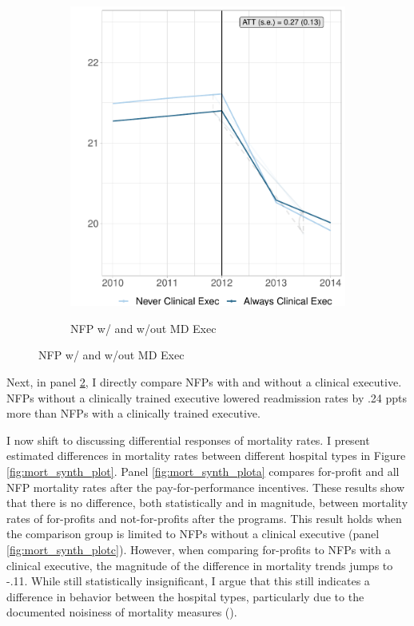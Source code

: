 \documentclass[12pt]{article}
\begin{document}
\begin{figure}
\begin{subfigure}[b]{0.45\textwidth}
         \label{fig:read_synth_plotc}
     \end{subfigure}
     \hfill
     \begin{subfigure}[b]{0.45\textwidth}
         \centering
         \caption{NFP w/ and w/out MD Exec}
         \includegraphics[width=\textwidth]{Objects/read_md_nomd_synth_graph.pdf}
         \label{fig:read_synth_plotd}
     \end{subfigure}
        \label{fig:read_synth_plot}
    \end{figure}

    Next, in panel \ref{fig:read_synth_plotd}, I directly compare NFPs with and without a clinical executive. NFPs without a clinically trained executive lowered readmission rates by .24 ppts more than NFPs with a clinically trained executive. 

    I now shift to discussing differential responses of mortality rates. I present estimated differences in mortality rates between different hospital types in Figure \ref{fig:mort_synth_plot}. Panel \ref{fig:mort_synth_plota} compares for-profit and all NFP mortality rates after the pay-for-performance incentives. These results show that there is no difference, both statistically and in magnitude, between mortality rates of for-profits and not-for-profits after the programs. This result holds when the comparison group is limited to NFPs without a clinical executive (panel \ref{fig:mort_synth_plotc}). However, when comparing for-profits to NFPs with a clinical executive, the magnitude of the difference in mortality trends jumps to -.11. While still statistically insignificant, I argue that this still indicates a difference in behavior between the hospital types, particularly due to the documented noisiness of mortality measures (\cite{mackenzie2016measuring}). 
\end{document}
